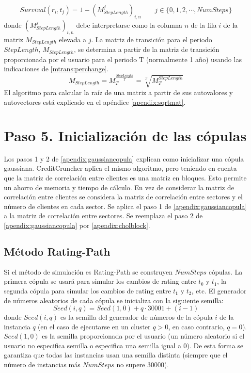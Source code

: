 \begin{displaymath}
Survival(r_i,t_j) = 1 - (M_{StepLength}^j)_{i,n} \qquad j \in \{0,1,2,\cdots,NumSteps\}
\end{displaymath}
donde $(M_{StepLength}^j)_{i,n}$ debe interpretarse como la columna $n$ de
la fila $i$ de la matriz $M_{StepLength}$ elevada a $j$. La matriz de transici\'on
para el periodo $StepLength$, $M_{StepLength}$, se determina a partir de la matriz
de transici\'on proporcionada por el usuario para el periodo T (normalmente 1 a\~no)
usando las indicaciones de \ref{mtrans:perchange}.
\begin{displaymath}
M_{StepLength} = M_{T}^{\frac{StepLength}{T}} = \sqrt[T]{M_{T}^{StepLength}}
\end{displaymath}
El algoritmo para calcular la ra\'iz de una matriz a partir de sus
autovalores y autovectores est\'a explicado en el ap\'endice
\ref{apendix:sqrtmat}.


\section{Paso 5. Inicializaci\'on de las c\'opulas}

Los pasos 1 y 2 de \ref{apendix:gaussiancopula} explican como
inicializar una c\'opula gaussiana. CreditCruncher aplica el 
mismo algoritmo, pero teniendo en cuenta que la matriz de
correlaci\'on entre clientes es una matriz en bloques. Esto
permite un ahorro de memoria y tiempo de c\'alculo. En vez de
considerar la matriz de correlaci\'on entre clientes se
considera la matriz de correlaci\'on entre sectores y el
n\'umero de clientes en cada sector. Se aplica el paso 1
de \ref{apendix:gaussiancopula} a la matriz de correlaci\'on
entre sectores. Se reemplaza el paso 2 de \ref{apendix:gaussiancopula}
por \ref{apendix:cholblock}.


\subsection{M\'etodo Rating-Path}

Si el m\'etodo de simulaci\'on es Rating-Path se construyen
$NumSteps$ c\'opulas. La primera c\'opula se usar\'a para simular
los cambios de rating entre $t_0$ y $t_1$, la segunda c\'opula
para simular los cambios de rating entre $t_1$ y $t_2$, etc.
\newline
\newline
El generador de n\'umeros aleatorios de cada c\'opula se
inicializa con la siguiente semilla:
\begin{displaymath}
Seed(i,q) = Seed(1,0) + q \cdot 30001 + (i-1)
\end{displaymath}
donde $Seed(i,q)$ es la semilla del generador de n\'umeros de la
c\'opula $i$ de la instancia $q$ (en el caso de ejecutarse en un
cluster $q>0$, en caso contrario, $q=0$). $Seed(1,0)$ es la semilla
proporcionada por el usuario (un n\'umero aleatorio si el usuario no
especifica semilla o especifica una semilla igual a 0). De esta
forma se garantiza que todas las instancias usan una semilla distinta
(siempre que el n\'umero de instancias m\'as $NumSteps$ no supere 30000).

